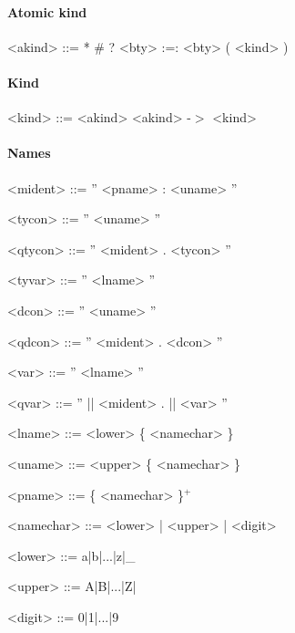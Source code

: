 \begin{scriptsize}
\paragraph{Atomic kind}

\begin{grammar}
<akind> ::= *
       \alt \#
       \alt ?
       \alt <bty> :=: <bty>
       \alt ( <kind> )
\end{grammar}

\paragraph{Kind}

\begin{grammar}
<kind> ::= <akind>
      \alt <akind> -$>$ <kind>
\end{grammar}


\paragraph{Names}

\begin{grammar}
<mident>	  ::= 	 '' <pname> : <uname> ''
	
<tycon>		  ::= 	 '' <uname> ''
		
<qtycon>	  ::= 	 '' <mident> . <tycon> ''

<tyvar>		  ::= 	 '' <lname> ''
	
<dcon>		  ::= 	 '' <uname> ''
	
<qdcon>		  ::= 	 '' <mident> . <dcon> ''

<var>		  ::= 	 '' <lname> ''

<qvar>		  ::= 	 '' || <mident> . || <var> ''

<lname>		  ::= 	 <lower> \{ <namechar> \}
 
<uname>		  ::= 	 <upper> \{ <namechar> \}

<pname>		  ::= 	 \{ <namechar> \}$^+$

<namechar>	  ::= 	 <lower> | <upper> | <digit>

<lower>		  ::= 	 a|b|...|z|\_

<upper>		  ::= 	 A|B|...|Z|

<digit>		  ::= 	 0|1|...|9									 


\end{grammar}




\end{scriptsize}
